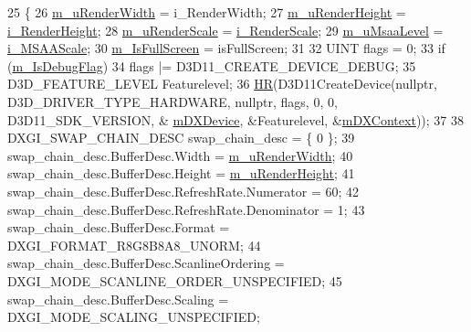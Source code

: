 \begin{DoxyCode}
25 \{
26     \hyperlink{class_comet_engine_1_1_renderer_1_1_comet_engine_d_x_renderer_a3127a8dc19e4bd799fa7e1bfff28de11}{m\_uRenderWidth}  = i\_RenderWidth;
27     \hyperlink{class_comet_engine_1_1_renderer_1_1_comet_engine_d_x_renderer_af8f780a50f9325d3bad66c1ba49ed533}{m\_uRenderHeight} = \hyperlink{_d_l_l_comet_engine_renderer_8cpp_ab996e2b2e12adfc087c67cebde9194e6}{i\_RenderHeight};
28     \hyperlink{class_comet_engine_1_1_renderer_1_1_comet_engine_d_x_renderer_a00acfc4bfe2d732584f5ae0cb28186d8}{m\_uRenderScale} = \hyperlink{_d_l_l_comet_engine_renderer_8cpp_a901222d6138bd4efc54d4eda8460c65b}{i\_RenderScale};
29     \hyperlink{class_comet_engine_1_1_renderer_1_1_comet_engine_d_x_renderer_aee26a00f9adfbcf0a5de3a91ec7e322d}{m\_uMsaaLevel} = \hyperlink{_d_l_l_comet_engine_renderer_8cpp_a7016fffcce13da83a94427468f9bf950}{i\_MSAAScale};
30     \hyperlink{class_comet_engine_1_1_renderer_1_1_comet_engine_d_x_renderer_aa6179af78a783f7c0d77d6ea9b95abfb}{m\_IsFullScreen} = isFullScreen;
31 
32     UINT flags = 0;
33     \textcolor{keywordflow}{if} (\hyperlink{class_comet_engine_1_1_renderer_1_1_comet_engine_d_x_renderer_a4605315a46596f062351adb5071a334c}{m\_IsDebugFlag})
34         flags |= D3D11\_CREATE\_DEVICE\_DEBUG;
35     D3D\_FEATURE\_LEVEL Featurelevel;
36     \hyperlink{_comet_engine_d_x_renderer_8cpp_a924cd8cbf81756869040aed04fd33ca5}{HR}(D3D11CreateDevice(\textcolor{keyword}{nullptr}, D3D\_DRIVER\_TYPE\_HARDWARE, \textcolor{keyword}{nullptr}, flags, 0, 0, D3D11\_SDK\_VERSION, &
      \hyperlink{class_comet_engine_1_1_renderer_1_1_comet_engine_d_x_renderer_ac606b85554250d2e65a2aa9f10e6aa45}{mDXDevice}, &Featurelevel, &\hyperlink{class_comet_engine_1_1_renderer_1_1_comet_engine_d_x_renderer_ad38b8ad7fd1c747698a96256e75eb635}{mDXContext}));
37 
38     DXGI\_SWAP\_CHAIN\_DESC swap\_chain\_desc = \{ 0 \};
39     swap\_chain\_desc.BufferDesc.Width = \hyperlink{class_comet_engine_1_1_renderer_1_1_comet_engine_d_x_renderer_a3127a8dc19e4bd799fa7e1bfff28de11}{m\_uRenderWidth};
40     swap\_chain\_desc.BufferDesc.Height = \hyperlink{class_comet_engine_1_1_renderer_1_1_comet_engine_d_x_renderer_af8f780a50f9325d3bad66c1ba49ed533}{m\_uRenderHeight};
41     swap\_chain\_desc.BufferDesc.RefreshRate.Numerator = 60;
42     swap\_chain\_desc.BufferDesc.RefreshRate.Denominator = 1;
43     swap\_chain\_desc.BufferDesc.Format = DXGI\_FORMAT\_R8G8B8A8\_UNORM;
44     swap\_chain\_desc.BufferDesc.ScanlineOrdering = DXGI\_MODE\_SCANLINE\_ORDER\_UNSPECIFIED;
45     swap\_chain\_desc.BufferDesc.Scaling = DXGI\_MODE\_SCALING\_UNSPECIFIED;

\end{DoxyCode}
